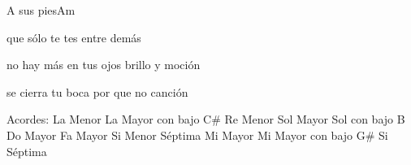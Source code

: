 \documentclass[12pt, spanish]{book}
\begin{document}
\begin{song}{A sus pies}{Am}
\begin{SBOpGroup}
            que sólo te tes entre  demás

             no hay más en tus ojos brillo y moción

             se cierra tu boca por que no  canción
        \end{SBOpGroup}

        \ifChordBk
        \begin{SBOpGroup}
            Acordes:\break
            \upchord{\Am}\qquad La Menor \hfill
            \upchord{\ACs}\qquad La Mayor con bajo C\# \hfill\null\break
            \upchord{\Dm}\qquad Re Menor \hfill
            \upchord{\G}\qquad Sol Mayor \hfill\null\break
            \upchord{\GB}\qquad\qquad Sol con bajo B\qquad \hfill
            \upchord{\C}\qquad Do Mayor \hfill\null\break
            \upchord{\F}\qquad Fa Mayor \hfill
            \upchord{\Bmseven}\qquad Si Menor S\'eptima \hfill\null\break
            \upchord{\E}\qquad Mi Mayor \hfill
            \upchord{\EGs}\qquad Mi Mayor con bajo G\# \hfill\null\break
            \upchord{\Bseven}\qquad Si S\'eptima \hfill\null\break
        \end{SBOpGroup}
        \fi
    \end{song}
\end{document}
